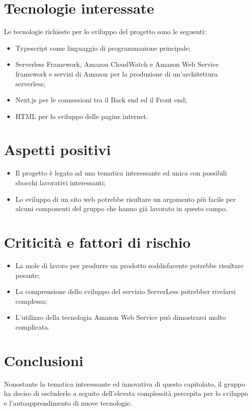 \section{Tecnologie interessate}
Le tecnologie richieste per lo sviluppo del progetto sono le seguenti:
\begin{itemize}
	\item Typescript come linguaggio di programmazione principale;
	\item Serverless Framework, Amazon CloudWatch e Amazon Web Service framework e servizi di Amazon per la produzione di un'architettura serverless;
	\item Next.js per le connessioni tra il Back end ed il Front end;
	\item HTML per lo sviluppo delle pagine internet.
\end{itemize}
\section{Aspetti positivi}
\begin{itemize}
	\item Il progetto è legato ad una tematica interessante ed unica con possibili sbocchi lavorativi interessanti;
	\item Lo sviluppo di un sito web potrebbe risultare un argomento più facile per alcuni componenti del gruppo che hanno già lavorato in questo campo.
\end{itemize}
\section{Criticità e fattori di rischio}
\begin{itemize}
	\item La mole di lavoro per produrre un prodotto soddisfacente potrebbe risultare pesante;
	\item La comprensione dello sviluppo del servizio ServerLess potrebber rivelarsi complessa;
	\item L'utilizzo della tecnologia Amazon Web Service può dimostrarsi molto complicata.
\end{itemize}
\section{Conclusioni}
Nonostante la tematica interessante ed innovativa di questo capitolato, il gruppo ha deciso di escluderlo a seguito dell'elevata complessità percepita per lo sviluppo e l'autoapprendimento di nuove tecnologie.